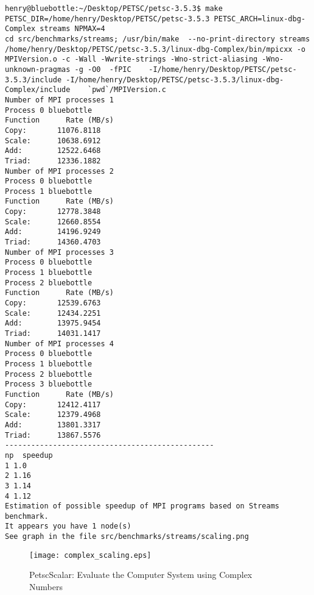 \documentclass{article}
\begin{document}
\begin{scriptsize}\begin{verbatim}
henry@bluebottle:~/Desktop/PETSC/petsc-3.5.3$ make PETSC_DIR=/home/henry/Desktop/PETSC/petsc-3.5.3 PETSC_ARCH=linux-dbg-Complex streams NPMAX=4
cd src/benchmarks/streams; /usr/bin/make  --no-print-directory streams
/home/henry/Desktop/PETSC/petsc-3.5.3/linux-dbg-Complex/bin/mpicxx -o MPIVersion.o -c -Wall -Wwrite-strings -Wno-strict-aliasing -Wno-unknown-pragmas -g -O0  -fPIC    -I/home/henry/Desktop/PETSC/petsc-3.5.3/include -I/home/henry/Desktop/PETSC/petsc-3.5.3/linux-dbg-Complex/include    `pwd`/MPIVersion.c
Number of MPI processes 1
Process 0 bluebottle
Function      Rate (MB/s) 
Copy:       11076.8118
Scale:      10638.6912
Add:        12522.6468
Triad:      12336.1882
Number of MPI processes 2
Process 0 bluebottle
Process 1 bluebottle
Function      Rate (MB/s) 
Copy:       12778.3848
Scale:      12660.8554
Add:        14196.9249
Triad:      14360.4703
Number of MPI processes 3
Process 0 bluebottle
Process 1 bluebottle
Process 2 bluebottle
Function      Rate (MB/s) 
Copy:       12539.6763
Scale:      12434.2251
Add:        13975.9454
Triad:      14031.1417
Number of MPI processes 4
Process 0 bluebottle
Process 1 bluebottle
Process 2 bluebottle
Process 3 bluebottle
Function      Rate (MB/s) 
Copy:       12412.4117
Scale:      12379.4968
Add:        13801.3317
Triad:      13867.5576
------------------------------------------------
np  speedup
1 1.0
2 1.16
3 1.14
4 1.12
Estimation of possible speedup of MPI programs based on Streams benchmark.
It appears you have 1 node(s)
See graph in the file src/benchmarks/streams/scaling.png
\end{verbatim}              \end{scriptsize}

\begin{figure}[htp]
    \centering
    \texttt{[image: complex\_scaling.eps]}
    \caption*{PetscScalar: Evaluate the Computer System using Complex Numbers}
    \label{checkerboard_lattice}
\end{figure}
\end{document}
